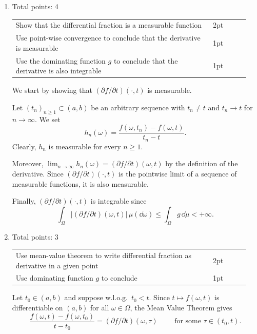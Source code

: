 \documentclass{lecturenotes}
\newcommand{\rubric}[1]{#1}
\begin{document}
\begin{enumerate}[label={(\alph*)}]
	\item \rubric{ Total points: 4 \hfill
	
	\begin{tabular}{p{0.8\linewidth}p{0.15\linewidth}}
	\hline
	Show that the differential fraction is a measurable function & 2pt\\
	Use point-wise convergence to conclude that the derivative is measurable & 1pt\\
	Use the dominating function $g$ to conclude that the derivative is also integrable & 1pt\\
	\hline
	\end{tabular}
	
	} 
	
	We start by showing that $(\partial f/\partial t)(\cdot,t)$ is measurable. 
	
	Let $(t_n)_{n\ge 1}\subset(a,b)$ be an arbitrary sequence with $t_n\ne t$ and $t_n\to t$ for $n\to\infty$. We set
	\[
		h_n(\omega) = \frac{f(\omega,t_n)-f(\omega,t)}{t_n-t}.
	\]
	Clearly, $h_n$ is measurable for every $n\ge 1$. 
	
	Moreover, $\lim_{n\to\infty} h_n(\omega) = (\partial f/\partial t)(\omega,t)$ by the definition of the derivative. Since $(\partial f/\partial t)(\cdot,t)$ is the pointwise limit of a sequence of measurable functions, it is also measurable. 
	
	Finally, $(\partial f/\partial t)(\cdot,t)$ is integrable since
	\[
		\int_\Omega |(\partial f/\partial t)(\omega,t)|\,\mu(\dd\omega) \le \int_\Omega g\,\dd\mu <+\infty.
	\]
	
	\item \rubric{ Total points: 3 \hfill
	
	\begin{tabular}{p{0.8\linewidth}p{0.15\linewidth}}
	\hline
	Use mean-value theorem to write differential fraction as derivative in a given point & 2pt\\
	Use dominating function $g$ to conclude & 1pt\\
	\hline
	\end{tabular}
	
	}
	
	Let $t_0\in (a,b)$ and suppose w.l.o.g.\ $t_0<t$. Since $t\mapsto f(\omega,t)$ is differentiable on $(a,b)$ for all $\omega\in\Omega$, the Mean Value Theorem gives
	\[
		\frac{f(\omega,t)-f(\omega,t_0)}{t-t_0} = (\partial f/\partial t)(\omega,\tau)\qquad\text{	for some $\tau\in(t_0,t)$.}
	\]
	

\end{enumerate}
\end{document}
